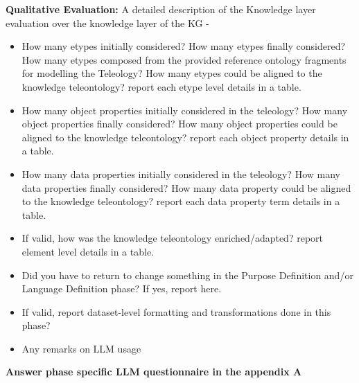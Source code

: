 \noident \textbf{Qualitative Evaluation:} A detailed description of the Knowledge layer evaluation over the knowledge layer of the KG -
\begin{itemize}
    \item How many etypes initially considered? How many etypes finally considered? How many etypes composed from the provided reference ontology fragments for modelling the Teleology? How many etypes could be aligned to the  knowledge teleontology? report each etype level details in a table.
    \item How many object properties initially considered in the teleology? How many object properties finally considered? How many object properties could be aligned to the knowledge teleontology? report each object property details in a table.
    \item How many data properties initially considered in the teleology? How many data properties finally considered?  How many data property could be aligned to the knowledge teleontology? report each data property term details in a table.
    \item If valid, how was the knowledge teleontology enriched/adapted? report element level details in a table.
    \item Did you have to return to change something in the Purpose Definition and/or Language Definition phase? If yes, report here.
    \item If valid, report dataset-level formatting and transformations done in this phase?
    \item Any remarks on LLM usage
\end{itemize}

\noident \textbf{Answer phase specific LLM questionnaire in the appendix A}